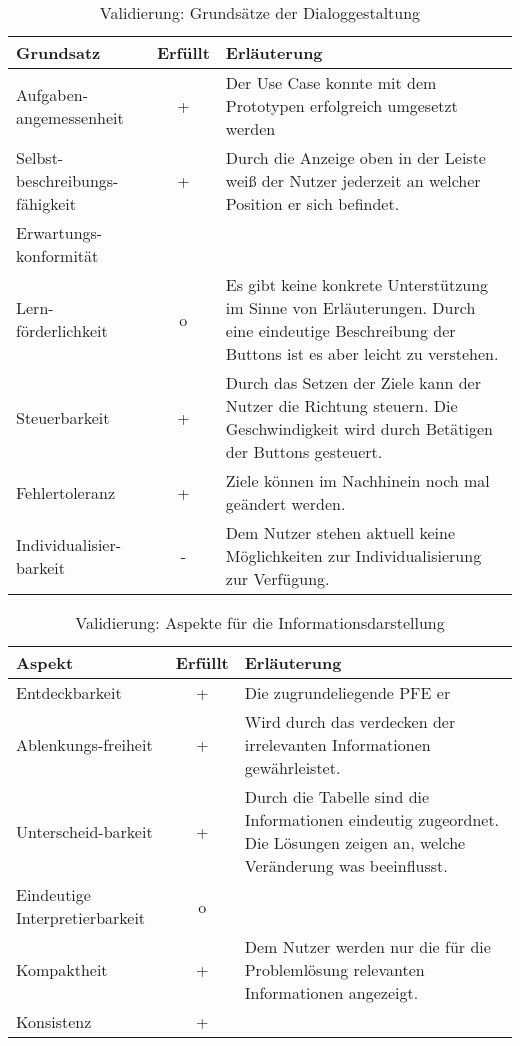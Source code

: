 \begin{table}
\centering
\begin{tabular}{p{}|c|p{}}
\textbf{Grundsatz} & \textbf{Erfüllt} & \textbf{Erläuterung} \\
\hline
Aufgaben-angemessenheit & + & Der Use Case konnte mit dem Prototypen erfolgreich umgesetzt werden \\
\hline
Selbst-beschreibungs-fähigkeit & + & Durch die Anzeige oben in der Leiste weiß der Nutzer jederzeit an welcher Position er sich befindet. \\
\hline
Erwartungs-konformität & & \\
\hline
Lern-förderlichkeit & o & Es gibt keine konkrete Unterstützung im Sinne von Erläuterungen. Durch eine eindeutige Beschreibung der Buttons ist es aber leicht zu verstehen. \\
\hline
Steuerbarkeit & + & Durch das Setzen der Ziele kann der Nutzer die Richtung steuern. Die Geschwindigkeit wird durch Betätigen der Buttons gesteuert. \\
\hline
Fehlertoleranz & + & Ziele können im Nachhinein noch mal geändert werden. \\
\hline
Individualisier-barkeit & - & Dem Nutzer stehen aktuell keine Möglichkeiten zur Individualisierung zur Verfügung. \\
\end{tabular}
\caption{Validierung: Grundsätze der Dialoggestaltung}
\end{table}

\begin{table}
\centering
\begin{tabular}{p{}|c|p{}}
\textbf{Aspekt} & \textbf{Erfüllt} & \textbf{Erläuterung} \\
\hline
Entdeckbarkeit & + & Die zugrundeliegende PFE er \\
\hline
Ablenkungs-freiheit & + & Wird durch das verdecken der irrelevanten Informationen gewährleistet. \\
\hline
Unterscheid-barkeit & + & Durch die Tabelle sind die Informationen eindeutig zugeordnet. Die Lösungen zeigen an, welche Veränderung was beeinflusst. \\
\hline
Eindeutige Interpretierbarkeit & o & \\
\hline
Kompaktheit & + & Dem Nutzer werden nur die für die Problemlösung relevanten Informationen angezeigt. \\
\hline
Konsistenz & + & \\
\end{tabular}
\caption{Validierung: Aspekte für die Informationsdarstellung}
\end{table}


